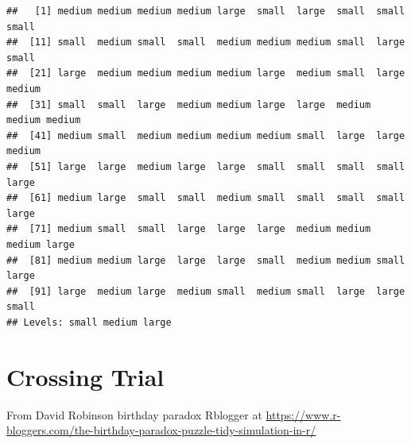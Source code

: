 \documentclass[]{book}
\newenvironment{Shaded}{\begin{snugshade}}{\end{snugshade}}
\newcommand{\DataTypeTok}[1]{\textcolor[rgb]{0.13,0.29,0.53}{#1}}
\newcommand{\DecValTok}[1]{\textcolor[rgb]{0.00,0.00,0.81}{#1}}
\newcommand{\KeywordTok}[1]{\textcolor[rgb]{0.13,0.29,0.53}{\textbf{#1}}}
\newcommand{\NormalTok}[1]{#1}
\newcommand{\OperatorTok}[1]{\textcolor[rgb]{0.81,0.36,0.00}{\textbf{#1}}}
\newcommand{\OtherTok}[1]{\textcolor[rgb]{0.56,0.35,0.01}{#1}}
\newcommand{\StringTok}[1]{\textcolor[rgb]{0.31,0.60,0.02}{#1}}
\begin{document}
\begin{verbatim}
##   [1] medium medium medium medium large  small  large  small  small  small 
##  [11] small  medium small  small  medium medium medium small  large  small 
##  [21] large  medium medium medium medium large  medium small  large  medium
##  [31] small  small  large  medium medium large  large  medium medium medium
##  [41] medium small  medium medium medium medium small  large  large  medium
##  [51] large  large  medium large  large  small  small  small  small  large 
##  [61] medium large  small  small  medium small  small  small  small  large 
##  [71] medium small  small  large  large  large  medium medium medium large 
##  [81] medium medium large  large  large  small  medium medium small  large 
##  [91] large  medium large  medium small  medium small  large  large  small 
## Levels: small medium large
\end{verbatim}

\hypertarget{crossingtrial}{%
\chapter{Crossing Trial}\label{crossingtrial}}

From David Robinson birthday paradox Rblogger at \url{https://www.r-bloggers.com/the-birthday-paradox-puzzle-tidy-simulation-in-r/}

\begin{Shaded}
\end{Shaded}
\end{document}
